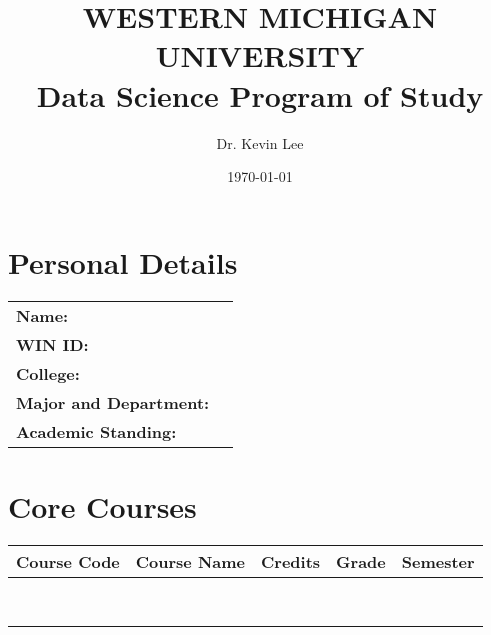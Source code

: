 \documentclass{article}
\title{\textbf{\Large WESTERN MICHIGAN UNIVERSITY} \\ 
\Large Data Science Program of Study}
\author{Dr. Kevin Lee}
\date{\today}
\begin{document}
\maketitle

\section*{Personal Details}
\begin{tabular}{ll}
    \textbf{Name:} &  \\
    \textbf{WIN ID:} & \\
    \textbf{College:} &  \\
    \textbf{Major and Department:} & \\
    \textbf{Academic Standing:} &  \\
\end{tabular}


\section*{Core Courses}
\begin{center}
\begin{tabularx}{\textwidth}{|l|X|c|c|c|}
    \hline
    \textbf{Course Code} & \textbf{Course Name} & \textbf{Credits} & \textbf{Grade} & \textbf{Semester} \\
    \hline
     &  &  &  &  \\
    \hline
    &  &  &  &  \\
    \hline
    &  &  &  &  \\
    \hline
    &  &  &  &  \\
    \hline
    &  &  &  &  \\
    \hline
    &  &  &  &  \\
    \hline
    &  &  &  &  \\
    \hline
    &  &  &  &  \\
    \hline
\end{tabularx}
\end{center}
\end{document}
